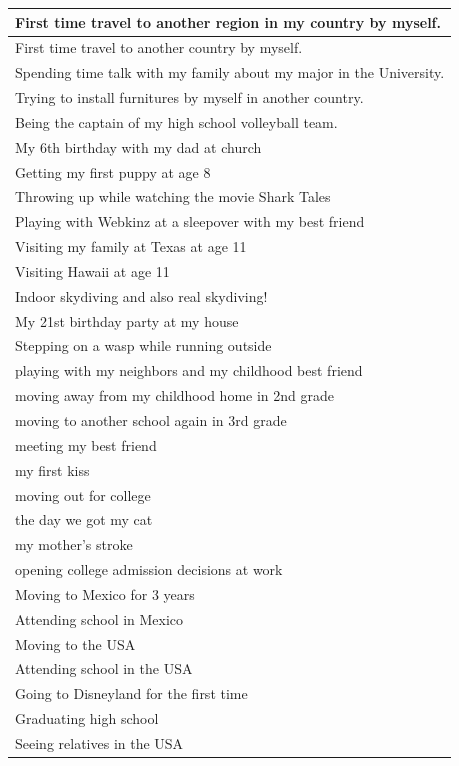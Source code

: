 \documentclass[
  .7em,
  letterpaper,
  DIV=11,
  numbers=noendperiod]{scrartcl}
\begin{document}
\begin{table}
\begin{tabular}{l}
\hline
First time travel to another region in my country by myself.\\
\hline
First time travel to another country by myself.\\
\hline
Spending time talk with my family about my major in the University.\\
\hline
Trying to install furnitures by myself in another country.\\
\hline
Being the captain of my high school volleyball team.\\
\hline
My 6th birthday with my dad at church\\
\hline
Getting my first puppy at age 8\\
\hline
Throwing up while watching the movie Shark Tales\\
\hline
Playing with Webkinz at a sleepover with my best friend\\
\hline
Visiting my family at Texas at age 11\\
\hline
Visiting Hawaii at age 11\\
\hline
Indoor skydiving and also real skydiving!\\
\hline
My 21st birthday party at my house\\
\hline
Stepping on a wasp while running outside\\
\hline
playing with my neighbors and my childhood best friend\\
\hline
moving away from my childhood home in 2nd grade\\
\hline
moving to another school again in 3rd grade\\
\hline
meeting my best friend\\
\hline
my first kiss\\
\hline
moving out for college\\
\hline
the day we got my cat\\
\hline
my mother's stroke\\
\hline
opening college admission decisions at work\\
\hline
Moving to Mexico for 3 years\\
\hline
Attending school in Mexico\\
\hline
Moving to the USA\\
\hline
Attending school in the USA\\
\hline
Going to Disneyland for the first time\\
\hline
Graduating high school\\
\hline
Seeing relatives in the USA\\

\end{tabular}
\end{table}
\end{document}
